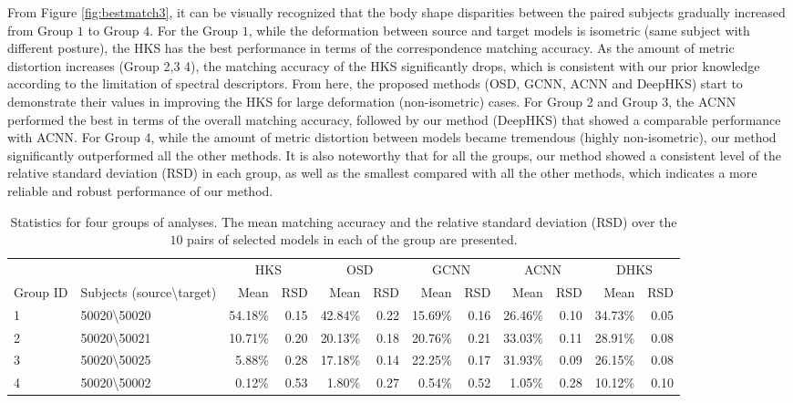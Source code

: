 \documentclass[5p,twocolumn,10pt,times]{elsarticle}
\begin{document}
From Figure \ref{fig:bestmatch3}, it can be visually recognized that the body shape disparities between the paired subjects gradually increased from Group $1$ to Group $4$. For the Group $1$, while the deformation between source and target models is isometric (same subject with different posture), the HKS has the best performance in terms of the correspondence matching accuracy. As the amount of metric distortion increases (Group 2,3 4), the matching accuracy of the HKS significantly drops, which is consistent with our prior knowledge according to the limitation of spectral descriptors. From here, the proposed methods (OSD, GCNN, ACNN and DeepHKS) start to demonstrate their values in improving the HKS for large deformation (non-isometric) cases. For Group 2 and Group 3, the ACNN performed the best in terms of the overall matching accuracy, followed by our method (DeepHKS) that showed a comparable performance with ACNN. For Group 4, while the amount of metric distortion between models became tremendous (highly non-isometric), our method significantly outperformed all the other methods. It is also noteworthy that for all the groups, our method showed a consistent level of the relative standard deviation (RSD) in each group, as well as the smallest compared with all the other methods, which indicates a more reliable and robust performance of our method.

\begin{center}
\begin{table*}
\begin{tabular}{l|l|rr|rr|rr|rr|rr}
     & & \multicolumn{2}{c|}{HKS} & \multicolumn{2}{c|}{OSD} & \multicolumn{2}{c|}{GCNN} & \multicolumn{2}{c|}{ACNN} & \multicolumn{2}{c}{DHKS} \\
    Group ID & Subjects (source\textbackslash target) & Mean & RSD & Mean & RSD & Mean & RSD & Mean & RSD & Mean & RSD \\
    \hline
     1 & 50020\textbackslash 50020 & 54.18\% & 0.15 & 42.84\% & 0.22 & 15.69\% & 0.16 & 26.46\% & 0.10 & 34.73\% & 0.05 \\
     2 & 50020\textbackslash 50021 & 10.71\% & 0.20 & 20.13\% & 0.18 & 20.76\% & 0.21 & 33.03\% & 0.11 & 28.91\% & 0.08 \\
     3 & 50020\textbackslash 50025 & 5.88\% & 0.28 & 17.18\% & 0.14 & 22.25\% & 0.17 & 31.93\% & 0.09 & 26.15\% & 0.08 \\
     4 & 50020\textbackslash 50002 & 0.12\% & 0.53 & 1.80\% & 0.27 & 0.54\% & 0.52 & 1.05\% & 0.28 & 10.12\% & 0.10
\end{tabular}
\caption{Statistics for four groups of analyses. The mean matching accuracy and the relative standard deviation (RSD) over the $10$ pairs of selected models in each of the group are presented.}
\label{tbl:DynaTest2}
\end{table*}
\end{center}
\end{document}
